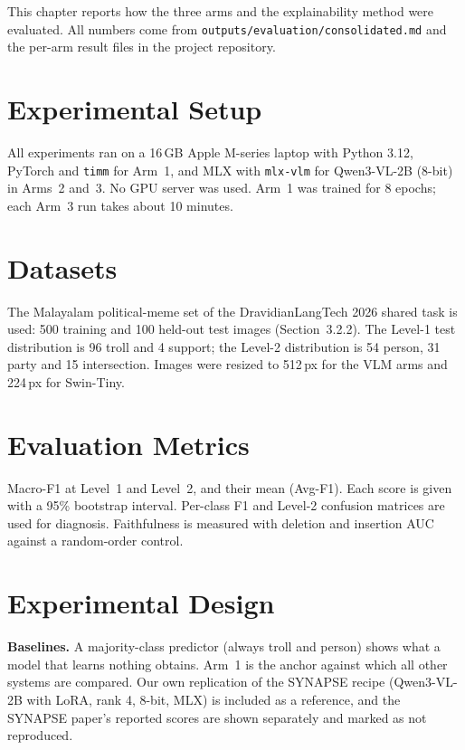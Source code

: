 \label{chap.4}
This chapter reports how the three arms and the explainability method were evaluated. All numbers come from \texttt{outputs/evaluation/consolidated.md} and the per-arm result files in the project repository.

\section{Experimental Setup}

All experiments ran on a 16\,GB Apple M-series laptop with Python 3.12, PyTorch and \texttt{timm} for Arm~1, and MLX with \texttt{mlx-vlm} for Qwen3-VL-2B (8-bit) in Arms~2 and~3. No GPU server was used. Arm~1 was trained for 8 epochs; each Arm~3 run takes about 10 minutes.

\section{Datasets}

The Malayalam political-meme set of the DravidianLangTech 2026 shared task is used: 500 training and 100 held-out test images (Section~3.2.2). The Level-1 test distribution is 96 troll and 4 support; the Level-2 distribution is 54 person, 31 party and 15 intersection. Images were resized to 512\,px for the VLM arms and 224\,px for Swin-Tiny.

\section{Evaluation Metrics}

Macro-F1 at Level~1 and Level~2, and their mean (Avg-F1). Each score is given with a 95\% bootstrap interval. Per-class F1 and Level-2 confusion matrices are used for diagnosis. Faithfulness is measured with deletion and insertion AUC against a random-order control.

\section{Experimental Design}

\textbf{Baselines.} A majority-class predictor (always troll and person) shows what a model that learns nothing obtains. Arm~1 is the anchor against which all other systems are compared. Our own replication of the SYNAPSE recipe (Qwen3-VL-2B with LoRA, rank 4, 8-bit, MLX) is included as a reference, and the SYNAPSE paper's reported scores are shown separately and marked as not reproduced.


